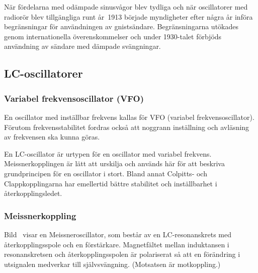 När fördelarna med odämpade sinusvågor blev tydliga och när oscillatorer med
radiorör blev tillgängliga runt år~1913 började myndigheter efter några år
införa begränsningar för användningen av gnistsändare.
Begränsningarna utökades genom internationella överenskommelser och under
1930-talet förbjöds användning av sändare med dämpade svängningar.

\subsection{LC-oscillatorer}
\label{svängningar_LC-oscillator}

\subsubsection{Variabel frekvensoscillator (VFO)}


En oscillator med inställbar frekvens kallas för VFO (variabel
frekvensoscillator).
Förutom frekvensstabilitet fordras också att noggrann inställning och
avläsning av frekvensen ska kunna göras.

En LC-oscillator är urtypen för en oscillator med variabel frekvens.
Meissnerkopplingen är lätt att urskilja och används här för att beskriva
grundprincipen för en oscillator i stort.
Bland annat Colpitts- och Clappkopplingarna har emellertid bättre stabilitet
och inställbarhet i återkopplingsledet.

\subsubsection{Meissnerkoppling}

Bild~ visar en Meissneroscillator, som består av en
LC-resonanskrets med återkopplingsspole och en förstärkare.
Magnetfältet mellan induktansen i resonanskretsen och återkopplingsspolen är
polariserat så att en förändring i utsignalen medverkar till självsvängning.
(Motsatsen är motkoppling.)


